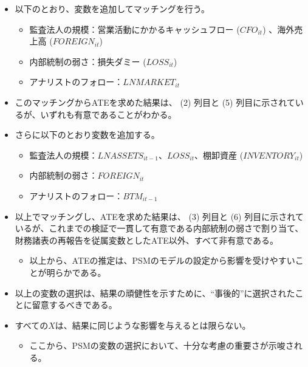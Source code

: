 \begin{itemize}
 \item 以下のとおり、変数を追加してマッチングを行う。
  \begin{itemize}
   \item 監査法人の規模：営業活動にかかるキャッシュフロー ($\mathit{CFO}_{it}$) 、海外売上高 ($\mathit{FOREIGN}_{it}$) 
   \item 内部統制の弱さ：損失ダミー ($\mathit{LOSS}_{it}$) 
   \item アナリストのフォロー：$\mathit{LNMARKET}_{it}$
  \end{itemize}
 \item このマッチングからATEを求めた結果は、 (2) 列目と (5) 列目に示されているが、いずれも有意であることがわかる。
 \item さらに以下のとおり変数を追加する。
  \begin{itemize}
   \item 監査法人の規模：$\mathit{LNASSETS}_{it-1}$、$LOSS_{it}$、棚卸資産 ($\mathit{INVENTORY}_{it}$) 
   \item 内部統制の弱さ：$\mathit{FOREIGN}_{it}$
   \item アナリストのフォロー：$\mathit{BTM}_{it-1}$
  \end{itemize}
 \item 以上でマッチングし、ATEを求めた結果は、 (3) 列目と (6) 列目に示されているが、これまでの検証で一貫して有意である内部統制の弱さで割り当て、財務諸表の再報告を従属変数としたATE以外、すべて非有意である。
  \begin{itemize}
   \item 以上から、ATEの推定は、PSMのモデルの設定から影響を受けやすいことが明らかである。
  \end{itemize}
 \item 以上の変数の選択は、結果の頑健性を示すために、``事後的''に選択されたことに留意するべきである。
 \item すべての$X$は、結果に同じような影響を与えるとは限らない。
  \begin{itemize}
   \item ここから、PSMの変数の選択において、十分な考慮の重要さが示唆される。
  \end{itemize}
\end{itemize}

